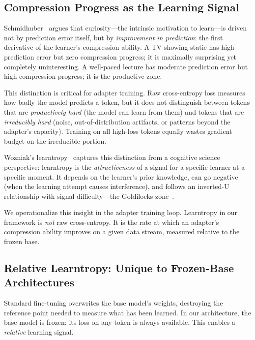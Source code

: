 \documentclass{article}
\begin{document}
\subsection{Compression Progress as the Learning Signal}
\label{sec:compression-progress}

Schmidhuber~\cite{schmidhuber2008} argues that curiosity---the
intrinsic motivation to learn---is driven not by prediction error itself,
but by \emph{improvement in prediction}: the first derivative of the
learner's compression ability. A TV showing static has high prediction
error but zero compression progress; it is maximally surprising yet
completely uninteresting. A well-paced lecture has moderate prediction
error but high compression progress; it is the productive zone.

This distinction is critical for adapter training. Raw cross-entropy
loss measures how badly the model predicts a token, but it does not
distinguish between tokens that are \emph{productively hard} (the model
can learn from them) and tokens that are \emph{irreducibly hard} (noise,
out-of-distribution artifacts, or patterns beyond the adapter's
capacity). Training on all high-loss tokens equally wastes gradient
budget on the irreducible portion.

Wozniak's learntropy~\cite{wozniak2018learntropy} captures this
distinction from a cognitive science perspective: learntropy is the
\emph{attractiveness} of a signal for a specific learner at a specific
moment. It depends on the learner's prior knowledge, can go negative
(when the learning attempt causes interference), and follows an
inverted-U relationship with signal difficulty---the Goldilocks
zone~\cite{vygotsky1978}.

We operationalize this insight in the adapter training loop. Learntropy
in our framework is \emph{not} raw cross-entropy. It is the rate at
which an adapter's compression ability improves on a given data stream,
measured relative to the frozen base.

\subsection{Relative Learntropy: Unique to Frozen-Base Architectures}
\label{sec:relative-learntropy}

Standard fine-tuning overwrites the base model's weights, destroying the
reference point needed to measure what has been learned. In our
architecture, the base model is frozen: its loss on any token is always
available. This enables a \emph{relative} learning signal.
\end{document}
